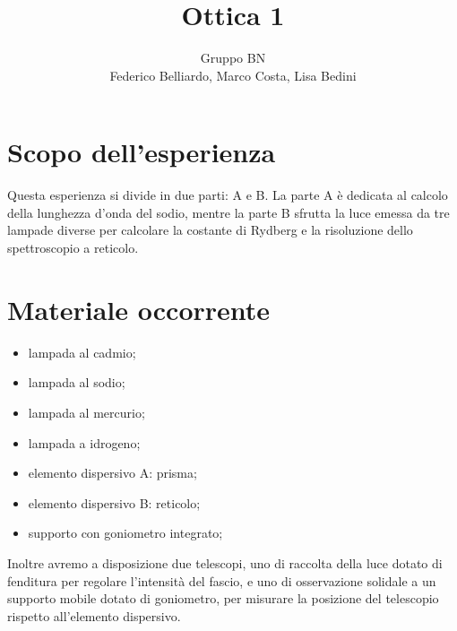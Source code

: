 \documentclass[10pt,a4paper]{article}
\author{Gruppo BN \\ Federico Belliardo, Marco Costa, Lisa Bedini}
\title{Ottica 1}
\begin{document}
\maketitle
\section{Scopo dell'esperienza}
Questa esperienza si divide in due parti: A e B.
La parte A è dedicata al calcolo della lunghezza d'onda del sodio, mentre la parte B sfrutta la luce emessa da tre lampade diverse per calcolare la costante di Rydberg e la risoluzione dello spettroscopio a reticolo.\\

\section{Materiale occorrente}
\begin{itemize}
\item lampada al cadmio;
\item lampada al sodio;
\item lampada al mercurio;
\item lampada a idrogeno;
\item elemento dispersivo A: prisma;
\item elemento dispersivo B: reticolo;
\item supporto con goniometro integrato;
\end{itemize}
Inoltre avremo a disposizione due telescopi, uno di raccolta della luce dotato di fenditura per regolare l'intensità del fascio, e uno di osservazione solidale a un supporto mobile dotato di goniometro, per misurare la posizione del telescopio rispetto all'elemento dispersivo.\\
\end{document}
